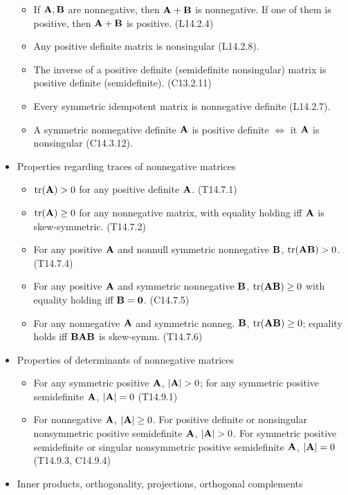 \documentclass[a4paper, oneside]{book}
\begin{document}
\begin{itemize}
\begin{itemize}
	\item If $\mathbf{A},\mathbf{B}$ are nonnegative, then $\mathbf{A+B}$ is nonnegative. If one of them is positive, then $\mathbf{A+B}$ is positive. (L14.2.4)
	\item Any positive definite matrix is nonsingular (L14.2.8).
	\item The inverse of a positive definite (semidefinite nonsingular) matrix is positive definite (semidefinite). (C13.2.11)
	\item Every symmetric idempotent matrix is nonnegative definite (L14.2.7).
	\item A symmetric nonnegative definite $\mathbf{A}$ is positive definite $\iff$ it $\mathbf{A}$ is nonsingular (C14.3.12).
\end{itemize}
\item Properties regarding traces of nonnegative matrices
\begin{itemize}
	\item $\text{tr}(\mathbf{A})>0$ for any positive definite $\mathbf{A}$. (T14.7.1)
	\item $\text{tr}(\mathbf{A})\ge 0$ for any nonnegative matrix, with equality holding iff $\mathbf{A}$ is skew-symmetric. (T14.7.2)
	\item For any positive $\mathbf{A}$ and nonnull symmetric nonnegative $\mathbf{B}$, $\text{tr}(\mathbf{AB})>0$. (T14.7.4)
	\item For any positive $\mathbf{A}$ and symmetric nonnegative $\mathbf{B}$, $\text{tr}(\mathbf{AB})\ge 0$ with equality holding iff $\mathbf{B}=\mathbf{0}$. (C14.7.5)
	\item For any nonnegative $\mathbf{A}$ and symmetric nonneg. $\mathbf{B}$, $\text{tr}(\mathbf{AB})\ge 0$; equality holds iff $\mathbf{BAB}$ is skew-symm. (T14.7.6)
	\end{itemize}
\item Properties of determinants of nonnegative matrices
\begin{itemize} 
\item For any symmetric positive $\mathbf{A}$, $|\mb{A}|>0$; for any symmetric positive semidefinite $\mathbf{A}$, $|\mathbf{A}|=0$ (T14.9.1)
\item For nonnegative $\mathbf{A}$, $|\mathbf{A}|\ge 0$. For positive definite or nonsingular nonsymmetric positive semidefinite $\mathbf A$, $|\mb{A}|>0$. For symmetric positive semidefinite or singular nonsymmetric positive semidefinite $\mathbf A$, $|\mathbf{A}|=0$ (T14.9.3, C14.9.4)
\end{itemize}
\item Inner products, orthogonality, projections, orthogonal complements
	\begin{itemize}

\end{itemize}
\end{itemize}
\end{document}
